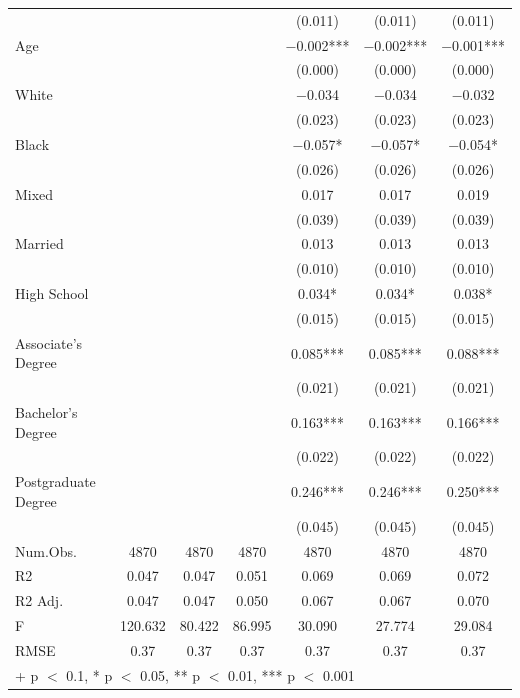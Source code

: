 \documentclass[
]{article}
\begin{document}
\begin{table}
{\begin{tabular}[t]{lcccccc}
 &  &  &  & (\num{0.011}) & (\num{0.011}) & (\num{0.011})\\
Age &  &  &  & \num{-0.002}*** & \num{-0.002}*** & \num{-0.001}***\\
 &  &  &  & (\num{0.000}) & (\num{0.000}) & (\num{0.000})\\
White &  &  &  & \num{-0.034} & \num{-0.034} & \num{-0.032}\\
 &  &  &  & (\num{0.023}) & (\num{0.023}) & (\num{0.023})\\
Black &  &  &  & \num{-0.057}* & \num{-0.057}* & \num{-0.054}*\\
 &  &  &  & (\num{0.026}) & (\num{0.026}) & (\num{0.026})\\
Mixed &  &  &  & \num{0.017} & \num{0.017} & \num{0.019}\\
 &  &  &  & (\num{0.039}) & (\num{0.039}) & (\num{0.039})\\
Married &  &  &  & \num{0.013} & \num{0.013} & \num{0.013}\\
 &  &  &  & (\num{0.010}) & (\num{0.010}) & (\num{0.010})\\
High
School &  &  &  & \num{0.034}* & \num{0.034}* & \num{0.038}*\\
 &  &  &  & (\num{0.015}) & (\num{0.015}) & (\num{0.015})\\
Associate's
Degree &  &  &  & \num{0.085}*** & \num{0.085}*** & \num{0.088}***\\
 &  &  &  & (\num{0.021}) & (\num{0.021}) & (\num{0.021})\\
Bachelor's
Degree &  &  &  & \num{0.163}*** & \num{0.163}*** & \num{0.166}***\\
 &  &  &  & (\num{0.022}) & (\num{0.022}) & (\num{0.022})\\
Postgraduate
Degree &  &  &  & \num{0.246}*** & \num{0.246}*** & \num{0.250}***\\
 &  &  &  & (\num{0.045}) & (\num{0.045}) & (\num{0.045})\\
\midrule
Num.Obs. & \num{4870} & \num{4870} & \num{4870} & \num{4870} & \num{4870} & \num{4870}\\
R2 & \num{0.047} & \num{0.047} & \num{0.051} & \num{0.069} & \num{0.069} & \num{0.072}\\
R2 Adj. & \num{0.047} & \num{0.047} & \num{0.050} & \num{0.067} & \num{0.067} & \num{0.070}\\
F & \num{120.632} & \num{80.422} & \num{86.995} & \num{30.090} & \num{27.774} & \num{29.084}\\
RMSE & \num{0.37} & \num{0.37} & \num{0.37} & \num{0.37} & \num{0.37} & \num{0.37}\\
\bottomrule
\multicolumn{7}{l}{\rule{0pt}{1em}+ p $<$ 0.1, * p $<$ 0.05, ** p $<$ 0.01, *** p $<$ 0.001}\\
\end{tabular}}
\end{table}
\end{document}
